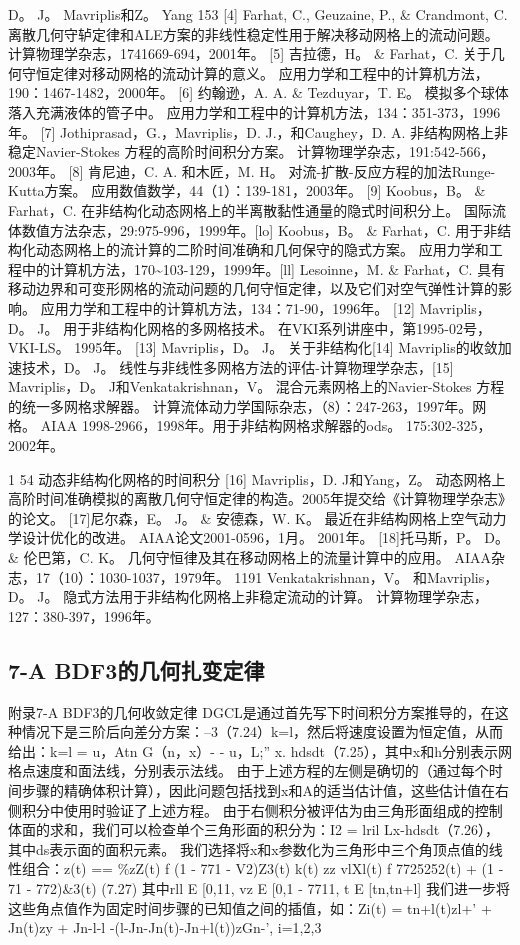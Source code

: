 \documentclass[UTF8,11pt,a4paper,openany,fontset=fandol]{ctexbook}
\begin{document}
D。 J。 Mavriplis和Z。 Yang 153 [4] Farhat, C., Geuzaine, P., \& Crandmont, C. 离散几何守轳定律和ALE方案的非线性稳定性用于解决移动网格上的流动问题。 计算物理学杂志，1741669-694，2001年。 [5] 吉拉德，H。 \& Farhat，C. 关于几何守恒定律对移动网格的流动计算的意义。 应用力学和工程中的计算机方法，190：1467-1482，2000年。 [6] 约翰逊，A. A. \& Tezduyar，T. E。 模拟多个球体落入充满液体的管子中。 应用力学和工程中的计算机方法，134：351-373，1996年。 [7] Jothiprasad，G.，Mavriplis，D. J.，和Caughey，D. A. 非结构网格上非稳定Navier-Stokes 方程的高阶时间积分方案。 计算物理学杂志，191:542-566，2003年。 [8] 肯尼迪，C. A. 和木匠，M. H。 对流-扩散-反应方程的加法Runge-Kutta方案。 应用数值数学，44（1）：139-181，2003年。 [9] Koobus，B。 \& Farhat，C. 在非结构化动态网格上的半离散黏性通量的隐式时间积分上。 国际流体数值方法杂志，29:975-996，1999年。[lo] Koobus，B。 \& Farhat，C. 用于非结构化动态网格上的流计算的二阶时间准确和几何保守的隐式方案。 应用力学和工程中的计算机方法，170\textasciitilde{}103-129，1999年。[ll] Lesoinne，M. \& Farhat，C. 具有移动边界和可变形网格的流动问题的几何守恒定律，以及它们对空气弹性计算的影响。 应用力学和工程中的计算机方法，134：71-90，1996年。 [12] Mavriplis，D。 J。 用于非结构化网格的多网格技术。 在VKI系列讲座中，第1995-02号，VKI-LS。 1995年。 [13] Mavriplis，D。 J。 关于非结构化[14] Mavriplis的收敛加速技术，D。 J。 线性与非线性多网格方法的评估-计算物理学杂志，[15] Mavriplis，D。 J和Venkatakrishnan，V。 混合元素网格上的Navier-Stokes 方程的统一多网格求解器。 计算流体动力学国际杂志，（8）：247-263，1997年。网格。 AIAA 1998-2966，1998年。用于非结构网格求解器的ods。 175:302-325，2002年。

1 54 动态非结构化网格的时间积分 [16] Mavriplis，D. J和Yang，Z。 动态网格上高阶时间准确模拟的离散几何守恒定律的构造。2005年提交给《计算物理学杂志》的论文。 [17]尼尔森，E。 J。 \& 安德森，W. K。 最近在非结构网格上空气动力学设计优化的改进。 AIAA论文2001-0596，1月。 2001年。 [18]托马斯，P。 D。 \& 伦巴第，C. K。 几何守恒律及其在移动网格上的流量计算中的应用。 AIAA杂志，17（10）：1030-1037，1979年。 1191 Venkatakrishnan，V。 和Mavriplis，D。 J。 隐式方法用于非结构化网格上非稳定流动的计算。 计算物理学杂志，127：380-397，1996年。

\subsection{7-A BDF3的几何扎变定律}
附录7-A BDF3的几何收敛定律 DGCL是通过首先写下时间积分方案推导的，在这种情况下是三阶后向差分方案：--3（7.24）k=l，然后将速度设置为恒定值，从而给出：k=l = u，Atn G（n，x）- - u，L;'' x. hdsdt（7.25），其中x和h分别表示网格点速度和面法线，分别表示法线。 由于上述方程的左侧是确切的（通过每个时间步骤的精确体积计算），因此问题包括找到x和A的适当估计值，这些估计值在右侧积分中使用时验证了上述方程。 由于右侧积分被评估为由三角形面组成的控制体面的求和，我们可以检查单个三角形面的积分为：I2 = lril Lx-hdsdt（7.26），其中ds表示面的面积元素。 我们选择将x和x参数化为三角形中三个角顶点值的线性组合：z(t) == \%zZ(t) f (1 - 771 - V2)Z3(t) k(t) zz vlXl(t) f 7725252(t) + (1 - 71 - 772)\&3(t) (7.27) 其中rll E [0,11, vz E [0,1 - 7711, t E [tn,tn+l] 我们进一步将这些角点值作为固定时间步骤的已知值之间的插值，如：Zi(t) = tn+l(t)zl+' + Jn(t)zy + Jn-l-l -(l-Jn-Jn(t)-Jn+l(t))zGn-', i=1,2,3
\end{document}
